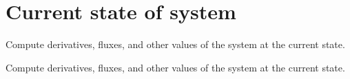 \hypertarget{group__state}{
\section{\-Current state of system}
\label{group__state}
}


\-Compute derivatives, fluxes, and other values of the system at the current state.  


\-Compute derivatives, fluxes, and other values of the system at the current state. 